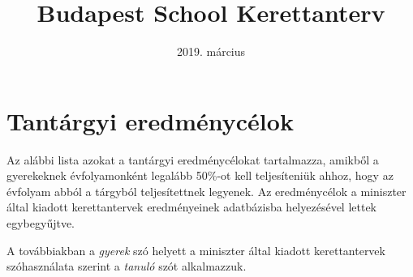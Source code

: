 \documentclass[magyar,12pt,a4paper,oneside,draf]{report}
\begin{document}
\newif\ifkerettanterv
\kerettantervtrue

\title{Budapest School Kerettanterv}
\author{}
\date{2019. m\'arcius}
\maketitle

\tableofcontents
\newpage






\chapter{Tantárgyi eredménycélok}
\label{sec:tantargyi_celok}
Az alábbi lista azokat a tantárgyi eredménycélokat tartalmazza, amikből a gyerekeknek évfolyamonként legalább 50\%-ot kell teljesíteniük ahhoz, hogy az évfolyam abból a tárgyból teljesítettnek legyenek. Az eredménycélok a miniszter által kiadott kerettantervek\cite{ofi:kerettanterv}  eredményeinek adatbázisba helyezésével lettek egybegyűjtve.

A továbbiakban a \emph{gyerek} szó helyett a miniszter által kiadott kerettantervek szóhasználata szerint a \emph{tanuló} szót alkalmazzuk.


{}
\label{sec:bibliographyk}

\end{document}
